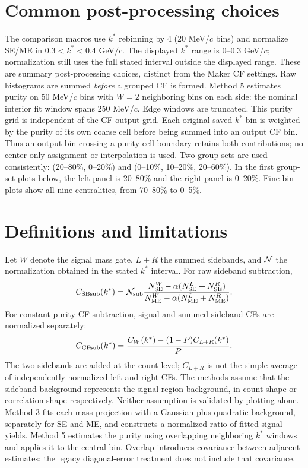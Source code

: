 \documentclass[11pt,a4paper]{article}
\begin{document}
\section{Common post-processing choices}
The comparison macros use $k^*$ rebinning by 4 (20 MeV/$c$ bins) and normalize SE/ME in $0.3<k^*<0.4$ GeV/$c$. The displayed $k^*$ range is $0$--$0.3$ GeV/$c$; normalization still uses the full stated interval outside the displayed range. These are summary post-processing choices, distinct from the Maker CF settings. Raw histograms are summed \emph{before} a grouped CF is formed.
Method 5 estimates purity on 50 MeV/$c$ bins with $W=2$ neighboring bins on each side: the nominal interior fit window spans 250 MeV/$c$. Edge windows are truncated. This purity grid is independent of the CF output grid. Each original saved $k^*$ bin is weighted by the purity of its own coarse cell before being summed into an output CF bin. Thus an output bin crossing a purity-cell boundary retains both contributions; no center-only assignment or interpolation is used.
Two group sets are used consistently: (20--80\%, 0--20\%) and (0--10\%, 10--20\%, 20--60\%). In the first group-set plots below, the left panel is 20--80\% and the right panel is 0--20\%. Fine-bin plots show all nine centralities, from 70--80\% to 0--5\%.
\clearpage\section{Definitions and limitations}
Let $W$ denote the signal mass gate, $L+R$ the summed sidebands, and ${\cal N}$ the normalization obtained in the stated $k^*$ interval. For raw sideband subtraction,
\begin{equation}C_{\rm SBsub}(k^*)={\cal N}_{\rm sub}\frac{N_{\rm SE}^{W}-\alpha(N_{\rm SE}^{L}+N_{\rm SE}^{R})}{N_{\rm ME}^{W}-\alpha(N_{\rm ME}^{L}+N_{\rm ME}^{R})}.\end{equation}
For constant-purity CF subtraction, signal and summed-sideband CFs are normalized separately:
\begin{equation}C_{\rm CFsub}(k^*)=\frac{C_W(k^*)-(1-P)C_{L+R}(k^*)}{P}.\end{equation}
The two sidebands are added at the count level; $C_{L+R}$ is not the simple average of independently normalized left and right CFs. The methods assume that the sideband background represents the signal-region background, in count shape or correlation shape respectively. Neither assumption is validated by plotting alone.
Method 3 fits each mass projection with a Gaussian plus quadratic background, separately for SE and ME, and constructs a normalized ratio of fitted signal yields. Method 5 estimates the purity using overlapping neighboring $k^*$ windows and applies it to the central bin. Overlap introduces covariance between adjacent estimates; the legacy diagonal-error treatment does not include that covariance.
\end{document}
